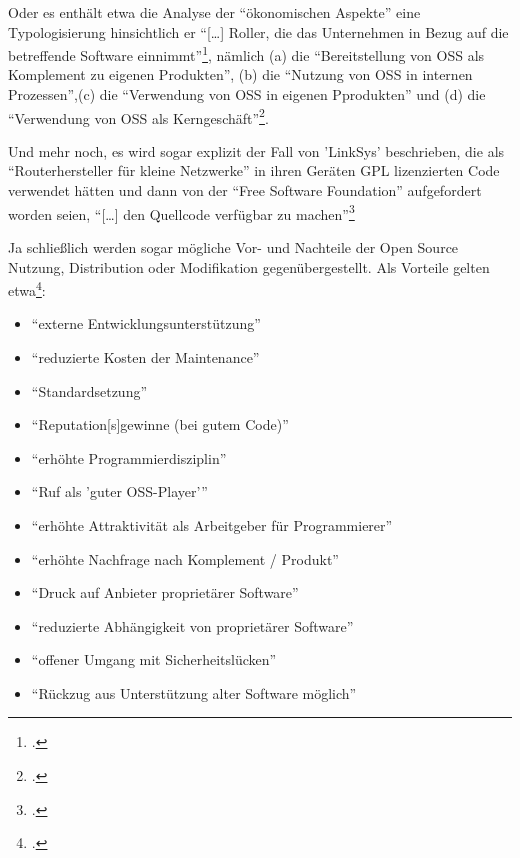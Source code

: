 \documentclass[DIV=calc,BCOR=5mm,11pt,headings=small,oneside,abstract=true, toc=bib]{scrartcl}
\begin{document}
Oder es enthält etwa die Analyse der \enquote{ökonomischen Aspekte} eine
Typologisierung hinsichtlich er \enquote{[\ldots] Roller, die das Unternehmen in
Bezug auf die betreffende Software
einnimmt}\footcite[vgl.][102]{BruHarPicCreFieHen2004a}, nämlich (a) die
\enquote{Bereitstellung von OSS als Komplement zu eigenen Produkten}, (b)
die \enquote{Nutzung von OSS in internen Prozessen},(c) die
\enquote{Verwendung von OSS in eigenen Pprodukten} und (d) die
\enquote{Verwendung von OSS als
Kerngeschäft}\footcite[vgl.][103]{BruHarPicCreFieHen2004a}. 

Und mehr noch,
es wird sogar explizit der Fall von 'LinkSys' beschrieben, die als
\enquote{Routerhersteller für kleine Netzwerke} in ihren Geräten GPL
lizenzierten Code verwendet hätten und dann von der \enquote{Free Software
Foundation} aufgefordert worden seien, \enquote{[\ldots] den
Quellcode verfügbar zu
machen}\footcite[vgl.][111]{BruHarPicCreFieHen2004a}

Ja schließlich werden sogar mögliche Vor- und Nachteile der Open Source
Nutzung, Distribution oder Modifikation gegenübergestellt. Als Vorteile gelten
etwa\footcite[vgl.][114]{BruHarPicCreFieHen2004a}:
\begin{itemize}
  \item \enquote{externe Entwicklungsunterstützung}
  \item \enquote{reduzierte Kosten der Maintenance}
  \item \enquote{Standardsetzung}
  \item \enquote{Reputation[s]gewinne (bei gutem Code)}
  \item \enquote{erhöhte Programmierdisziplin}
  \item \enquote{Ruf als 'guter OSS-Player'}
  \item \enquote{erhöhte Attraktivität als Arbeitgeber für Programmierer}
  \item \enquote{erhöhte Nachfrage nach Komplement / Produkt}
  \item \enquote{Druck auf Anbieter proprietärer Software}
  \item \enquote{reduzierte Abhängigkeit von proprietärer Software}
  \item \enquote{offener Umgang mit Sicherheitslücken}
  \item \enquote{Rückzug aus Unterstützung alter Software möglich}
\end{itemize}
\end{document}
